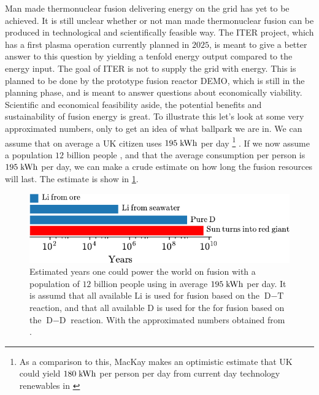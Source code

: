 Man made thermonuclear fusion delivering energy on the grid has yet to be achieved.
It is still unclear whether or not man made thermonuclear fusion can be produced in technological and scientifically feasible way.
The ITER \cite{ITERWeb} project, which has a first plasma operation currently planned in $2025$, is meant to give a better answer to this question by yielding a tenfold energy output compared to the energy input.
The goal of ITER is not to supply the grid with energy.
This is planned to be done by the prototype fusion reactor DEMO, which is still in the planning phase, and is meant to answer questions about economically viability.
Scientific and economical feasibility aside, the potential benefits and sustainability of fusion energy is great.
To illustrate this let's look at some very approximated numbers, only to get an idea of what ballpark we are in.
We can assume that on average a UK citizen uses $195 \text{\;kWh}$ per day%
\footnote{As a comparison to this, MacKay makes an optimistic estimate that UK could yield $180 \text{\;kWh}$ per person per day from current day technology renewables in \cite{Mackay2009book}}%
%
\cite{Mackay2009book}.
If we now assume a population $12$ billion people \cite{Melorose2015}, and that the average consumption per person is $195 \text{\;kWh}$ per day, we can make a crude estimate on how long the fusion resources will last.
The estimate is show in \cref{fig:potFusion}.
%
\begin{figure}[htb]
    \begin{center}
        \includegraphics{fig/intro/fusionSustain}
    \end{center}
    \caption{Estimated years one could power the world on fusion with a population of $12$ billion people using in average $195 \text{\;kWh}$ per day.
        It is assumd that all available $\text{Li}$ is used for fusion based on the $\text{D}-\text{T}$ reaction, and that all available $\text{D}$ is used for the for fusion based on the $\text{D}-\text{D}$ reaction.
        With the approximated numbers obtained from \cite{Melorose2015,Mackay2009book,ongena2012,Eckhartt1995}.}
    \label{fig:potFusion}
\end{figure}

